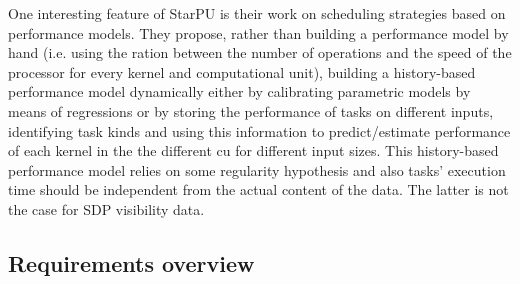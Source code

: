One interesting feature of StarPU is their work on scheduling strategies based on performance models. They propose, rather than building a performance model by hand (i.e. using the ration between the number of operations and the speed of the processor for every kernel and computational unit), building a history-based performance model dynamically either by calibrating parametric models by means of regressions or by storing the performance of tasks on different inputs, identifying task kinds and using this information to predict/estimate performance of each kernel in the the different cu for different input sizes. This history-based performance model relies on some regularity hypothesis and also tasks' execution time should be independent from the actual content of the data. The latter is not the case for SDP visibility data.


\subsection{Requirements overview}

